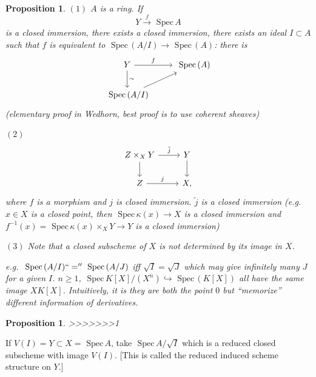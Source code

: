 \documentclass[11pt]{article}
\newtheorem{prop}[thm]{Proposition}
\newcommand{\spec}{\text{ Spec}\,}
\newcommand{\lrta}{\longrightarrow}
\newcommand{\inj}{\hookrightarrow}
\begin{document}
\begin{prop}
$(1)$
$A$ is a ring. If 
$$
Y\overset{f}{\lrta} \spec A
$$ 
is a closed immersion, there exists a closed immersion, there exists an ideal $I\subset A$ such that $f$ is equivalent to $\spec(A/I)\lrta \spec (A)$: there is 
$$
\begin{tikzcd}
Y \arrow[r, "f"] \arrow[d, "\sim"] & \spec(A) \\
\spec(A/I) \arrow[ru] & 
\end{tikzcd}
$$
(elementary proof in Wedhorn, best proof is to use coherent sheaves)

$(2)$ $$
\begin{tikzcd}
Z\times_X Y \arrow[r, "\tilde{j}"] \arrow[d] & Y \arrow[d] \\
Z \arrow[r, "j"] & X,
\end{tikzcd}
$$ 
where $f$ is a morphism and $j$ is closed immersion. $\tilde{j}$ is a closed immersion (e.g. $x\in X$ is a closed point, then $\spec \kappa(x)\lrta X$ is a closed immersion and $f^{-1}(x)=\spec \kappa(x)\times_X Y\lrta Y$ is a closed immersion)

$(3)$ Note that a closed subscheme of $X$ is not determined by its image in $X$.

e.g. $\spec(A/I)``=''\spec (A/J)$ iff $\sqrt{I}=\sqrt{J}$ which may give  infinitely many $J$ for  a given $I$.
$n\geq 1$, $\spec K[X]/(X^n)\inj \spec(K[X])$ all have the same image $XK[X]$. Intuitively, it is they are both the point $0$ but ``memorize'' different information of derivatives.
\end{prop}

\begin{prop}
>>>>>>>1
\end{prop}
If $V(I)=Y\subset X=\spec A$, take $\spec A/\sqrt{I}$ which is a reduced closed subscheme with image $V(I)$. [This is called the reduced induced scheme structure on $Y$.]
\end{document}
